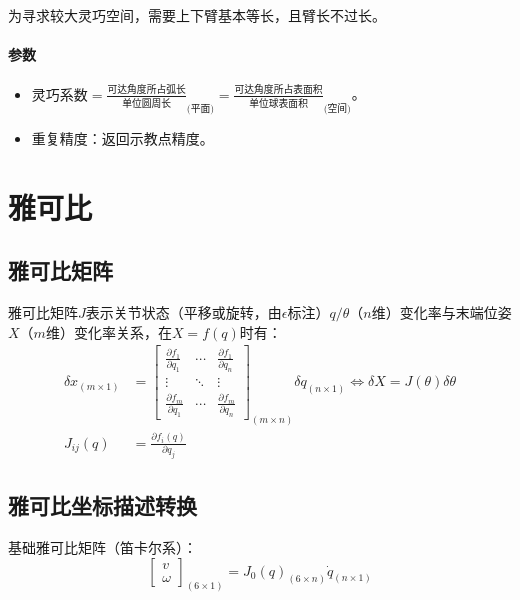 \documentclass[
12pt, %
a4paper, 
oneside, %
headinclude,footinclude, %
]{scrartcl}
\begin{document}
为寻求较大灵巧空间，需要上下臂基本等长，且臂长不过长。
\paragraph{参数}
\begin{itemize}
\item $ \text{灵巧系数} = \frac{\text{可达角度所占弧长}}{\text{单位圆周长}}_{\text{(平面)}} = \frac{\text{可达角度所占表面积}}{\text{单位球表面积}}_{\text{(空间)}} $。
\item 重复精度：返回示教点精度。
\end{itemize} 
\section{雅可比}
\subsection[雅可比矩阵]{雅可比矩阵}
雅可比矩阵$ J $表示关节状态（平移或旋转，由$ \epsilon $标注）$ q/\theta $（$ n $维）变化率与末端位姿$ X $（$ m $维）变化率关系，在$ X = f(q) $时有：
\begin{align*}
\delta x_{(m \times 1)} &= \begin{bmatrix} \frac{\partial f_1}{\partial q_1} & \cdots & \frac{\partial f_1}{\partial q_n} \\ \vdots & \ddots & \vdots \\ \frac{\partial f_m}{\partial q_1} & \cdots & \frac{\partial f_m}{\partial q_n} \end{bmatrix}_{(m \times n)} \delta q_{(n \times 1)} \Leftrightarrow \delta X = J(\theta) \delta \theta \\
J_{ij}(q) &= \frac{\partial f_i(q)}{\partial q_j}
\end{align*}
\subsection[雅可比坐标描述转换]{雅可比坐标描述转换}
基础雅可比矩阵（笛卡尔系）：
$$ \begin{bmatrix} v \\ \omega \end{bmatrix}_{(6 \times 1)} = J_0(q)_{(6 \times n)} \dot{q}_{(n \times 1)} $$
\end{document}
